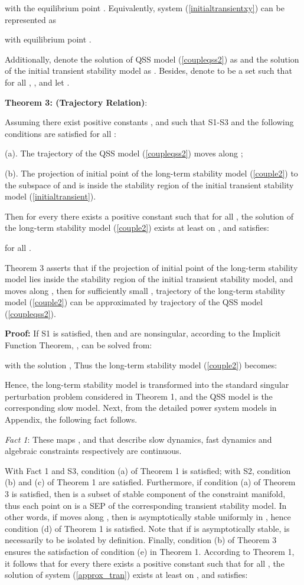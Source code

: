 \documentclass[journal]{IEEEtran}
\begin{document}
with the equilibrium point .
Equivalently, system (\ref{initialtransientxy}) can be represented as

with equilibrium point .

Additionally, denote the solution of QSS model (\ref{coupleqss2}) as  and the solution of the initial transient stability model as  . Besides, denote  to be a set such that for all , , and let .

\noindent\textbf{Theorem 3: (Trajectory Relation)}:

Assuming there exist positive constants ,  and  such that S1-S3 and the following conditions are satisfied for all :

(a). The trajectory  of the QSS model (\ref{coupleqss2}) moves along ;

(b). The projection of initial point  of the long-term stability model (\ref{couple2}) to the subspace of  and  is inside the stability region  of the initial transient stability model (\ref{initialtransient}).

Then for every  there exists a positive constant  such that for all , the solution  of the long-term stability model (\ref{couple2}) exists at least on , and satisfies:

for all .

Theorem 3 asserts that if the projection of initial point of the long-term stability model lies inside the stability region of the initial transient stability model, and  moves along , then for sufficiently small , trajectory of the long-term stability model (\ref{couple2}) can be approximated by trajectory of the QSS model (\ref{coupleqss2}).

\noindent\textbf{Proof:}
If S1 is satisfied, then  and  are nonsingular, according to the Implicit Function Theorem, ,  can be solved from:

with the solution , Thus the long-term stability model (\ref{couple2}) becomes:


Hence, the long-term stability model is transformed into the standard singular perturbation problem considered in Theorem 1, and the QSS model is the corresponding slow model. Next, from the detailed power system models in Appendix, the following fact follows.

\noindent\textit{Fact 1}: These maps ,  and  that describe slow dynamics, fast dynamics and algebraic constraints respectively are continuous.

With Fact 1 and S3, condition (a) of Theorem 1 is satisfied; with S2, condition (b) and (c) of Theorem 1 are satisfied. Furthermore, if condition (a) of Theorem 3 is satisfied, then  is a subset of stable component of the constraint manifold, thus each point on  is a SEP of the corresponding transient stability model. In other words, if  moves along , then  is  asymptotically stable uniformly in , hence condition (d) of Theorem 1 is satisfied. Note that if  is asymptotically stable,  is necessarily to be isolated by definition. Finally, condition (b) of Theorem 3 ensures the satisfaction of condition (e) in Theorem 1. According to Theorem 1, it follows that for every  there exists a positive constant  such that for all , the solution  of system (\ref{approx_tran}) exists at least on , and satisfies:
\end{document}
